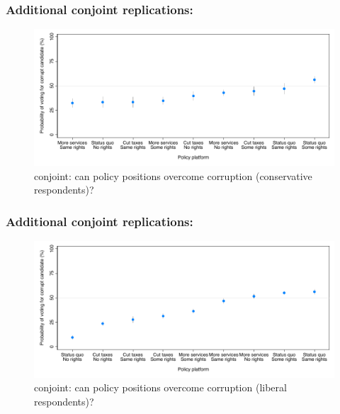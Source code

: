 \documentclass[usenames,dvipsnames]{beamer}
\begin{document}
\begin{frame}[label=fz_conjoint1]
\frametitle{Additional conjoint replications: \citet{franchino2015voting} \hyperlink{conjoint}{}}

\begin{figure}[!htb]
\begin{centering}
\includegraphics[scale=0.7]{../figs/fz_margins_right.pdf}
\caption{\citet{franchino2015voting} conjoint: can policy positions overcome corruption (conservative respondents)?}
\label{fig: funnel_re_survey}
\end{centering}
\end{figure}

\end{frame}


\begin{frame}[label=fz_conjoint2]
\frametitle{Additional conjoint replications: \citet{franchino2015voting} \hyperlink{conjoint}{}}

\begin{figure}[!htb]
\begin{centering}
\includegraphics[scale=0.7]{../figs/fz_margins_left.pdf}
\caption{\citet{franchino2015voting} conjoint: can policy positions overcome corruption (liberal respondents)?}
\label{fig: funnel_re_survey}
\end{centering}
\end{figure}

\end{frame}



\end{document}
